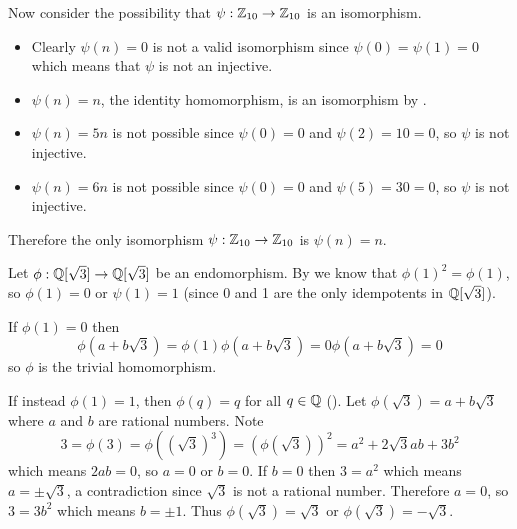 \begin{questions}
    Now consider the possibility that $\psi: \mathbb{Z}_{10} \to \mathbb{Z}_{10}$ is an isomorphism.
    \begin{itemize}
        \item Clearly $\psi(n) = 0$ is not a valid isomorphism since $\psi(0) = \psi(1) = 0$ which means that $\psi$ is not an injective.
        \item $\psi(n) = n$, the identity homomorphism, is an isomorphism by .
        \item $\psi(n) = 5n$ is not possible since $\psi(0) = 0$ and $\psi(2) = 10 = 0$, so $\psi$ is not injective.
        \item $\psi(n) = 6n$ is not possible since $\psi(0) = 0$ and $\psi(5) = 30 = 0$, so $\psi$ is not injective.
    \end{itemize}
    Therefore the only isomorphism $\psi:\mathbb{Z}_{10} \to \mathbb{Z}_{10}$ is $\psi(n) = n$.

    \item Let $\phi: \mathbb{Q}[\sqrt3] \to \mathbb{Q}[\sqrt3]$ be an endomorphism. By  we know that $\phi(1)^2 = \phi(1)$, so $\phi(1) = 0$ or $\psi(1) = 1$ (since 0 and 1 are the only idempotents in $\mathbb{Q}[\sqrt3]$).
    
    If $\phi(1) = 0$ then
    \[
        \phi(a+b\sqrt3) = \phi(1)\phi(a+b\sqrt3) = 0\phi(a+b\sqrt3) = 0
    \]
    so $\phi$ is the trivial homomorphism.

    If instead $\phi(1) = 1$, then $\phi(q) = q$ for all $q \in \mathbb{Q}$ (). Let $\phi(\sqrt3) = a+b\sqrt3$ where $a$ and $b$ are rational numbers. Note
    \[
        3 = \phi(3) = \phi((\sqrt3)^3) = \left(\phi(\sqrt3)\right)^2 = a^2+2\sqrt3ab+3b^2
    \]
    which means $2ab = 0$, so $a = 0$ or $b = 0$. If $b = 0$ then $3 = a^2$ which means $a = \pm\sqrt3$, a contradiction since $\sqrt3$ is not a rational number. Therefore $a = 0$, so $3 = 3b^2$ which means $b = \pm1$. Thus $\phi(\sqrt3) = \sqrt3$ or $\phi(\sqrt3) = -\sqrt3$.


\end{questions}
